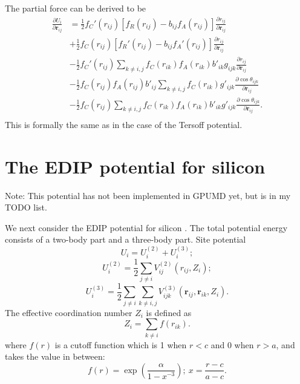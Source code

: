 \documentclass[12pt,a4paper]{report}
\newcommand{\vect}[1]{\boldsymbol{#1}}
\begin{document}
The partial force can be derived to be
\begin{align}
\frac{\partial U_i}{\partial \vect{r}_{ij}}
&= \frac{1}{2}f_C'(r_{ij})[f_R(r_{ij})-b_{ij}f_A(r_{ij})]\frac{\partial r_{ij}}{\partial \vect{r}_{ij}} \nonumber \\
&+ \frac{1}{2}f_C(r_{ij})[f_R'(r_{ij})-b_{ij}f_A'(r_{ij})]\frac{\partial r_{ij}}{\partial \vect{r}_{ij}} \nonumber \\
&- \frac{1}{2}f_C'(r_{ij})\sum_{k\neq i,j}f_C(r_{ik})f_A(r_{ik})b'_{ik}g_{ijk} \frac{\partial r_{ij}}{\partial \vect{r}_{ij}} \nonumber \\
&- \frac{1}{2}f_C(r_{ij})f_A(r_{ij})b'_{ij}\sum_{k\neq i,j}f_C(r_{ik})  g'_{ijk}
   \frac{\partial \cos\theta_{ijk}}{\partial \vect{r}_{ij}} \nonumber \\
&- \frac{1}{2}f_C(r_{ij})\sum_{k\neq i,j}f_C(r_{ik})f_A(r_{ik})b'_{ik}  g'_{ijk}
   \frac{\partial \cos\theta_{ijk}}{\partial \vect{r}_{ij}}. \nonumber \\
\end{align}
This is formally the same as in the case of the Tersoff potential.



\section{The EDIP potential for silicon}


Note: This potential has not been implemented in GPUMD yet, but is in my TODO list.

We next consider the EDIP potential for silicon \cite{bazant1997prb,justo1998prb}. The total potential energy consists of a two-body part and a three-body part. Site potential
\begin{equation}
U_i = U_i^{(2)} + U_i^{(3)};
\end{equation}
\begin{equation}
U_i^{(2)} = \frac{1}{2}\sum_{j\neq i} V^{(2)}_{ij}(r_{ij}, Z_i);
\end{equation}
\begin{equation}
U_i^{(3)} = \frac{1}{2}\sum_{j\neq i}\sum_{k\neq i,j}  V^{(3)}_{ijk} \left(\vect{r}_{ij}, \vect{r}_{ik},  Z_i \right).
\end{equation}
The effective coordination number $Z_i$ is defined as
\begin{equation}
Z_i = \sum_{k\neq i} f(r_{ik}).
\end{equation}
where $f(r)$ is a cutoff function which is 1 when $r<c$ and 0 when $r>a$, and takes the value in between:
\begin{equation}
f(r) = \exp\left( \frac{\alpha}{1-x^{-3}}\right); ~ x = \frac{r-c}{a-c}.
\end{equation}
\end{document}
